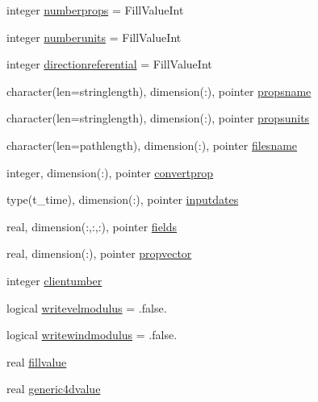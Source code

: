 \begin{DoxyCompactItemize}
\item 
integer \mbox{\hyperlink{structmoduleswan_1_1t__swan_aab0cf2f22d336629309720658e9a6433}{numberprops}} = Fill\+Value\+Int
\item 
integer \mbox{\hyperlink{structmoduleswan_1_1t__swan_a8d424630e4cf94893f1d837a6c8704be}{numberunits}} = Fill\+Value\+Int
\item 
integer \mbox{\hyperlink{structmoduleswan_1_1t__swan_a961f151b4d92741fb1a97d43a132ec73}{directionreferential}} = Fill\+Value\+Int
\item 
character(len=stringlength), dimension(\+:), pointer \mbox{\hyperlink{structmoduleswan_1_1t__swan_a1f841f54b4a3f28fc998bbb9aa26e7fb}{propsname}}
\item 
character(len=stringlength), dimension(\+:), pointer \mbox{\hyperlink{structmoduleswan_1_1t__swan_a8467d073b033b79cf47311b3f04bde50}{propsunits}}
\item 
character(len=pathlength), dimension(\+:), pointer \mbox{\hyperlink{structmoduleswan_1_1t__swan_a59cde837b4c7ed4203c324a6d57575f9}{filesname}}
\item 
integer, dimension(\+:), pointer \mbox{\hyperlink{structmoduleswan_1_1t__swan_aba590d1d8a68e5cc290f599daae07672}{convertprop}}
\item 
type(t\+\_\+time), dimension(\+:), pointer \mbox{\hyperlink{structmoduleswan_1_1t__swan_a06a2a91bdfb0189e82163320acb6adad}{inputdates}}
\item 
real, dimension(\+:,\+:,\+:), pointer \mbox{\hyperlink{structmoduleswan_1_1t__swan_ada1e4d24684d041b6efac5dd023d9b51}{fields}}
\item 
real, dimension(\+:), pointer \mbox{\hyperlink{structmoduleswan_1_1t__swan_aacce4c0fc3bf0f7c723cea829ed958b8}{propvector}}
\item 
integer \mbox{\hyperlink{structmoduleswan_1_1t__swan_a3143a602a44d17ae29c022d13919c7d9}{clientumber}}
\item 
logical \mbox{\hyperlink{structmoduleswan_1_1t__swan_afb02b3499eee9a6090d2e49183555a8f}{writevelmodulus}} = .false.
\item 
logical \mbox{\hyperlink{structmoduleswan_1_1t__swan_a94983ffcbe49cd6b95a057a28bf2d173}{writewindmodulus}} = .false.
\item 
real \mbox{\hyperlink{structmoduleswan_1_1t__swan_a8d8b4f3f3d22246deca45f7c80922c73}{fillvalue}}
\item 
real \mbox{\hyperlink{structmoduleswan_1_1t__swan_aaf1c41bce5bc189fd89118af4b89cb47}{generic4dvalue}}
\item 

\end{DoxyCompactItemize}
